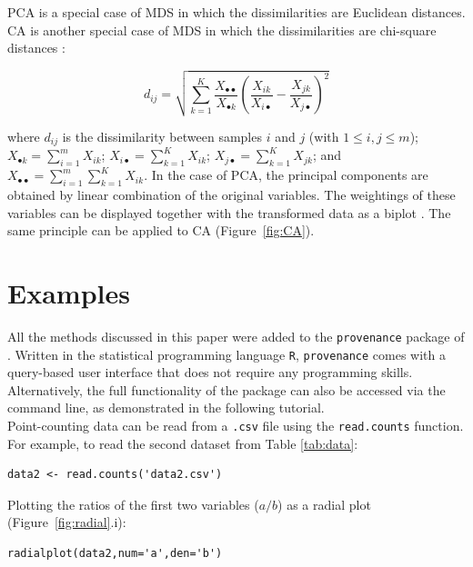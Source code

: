 \documentclass{article}
\begin{document}
PCA is a special case of MDS in which the dissimilarities are
Euclidean distances. CA is another special case of MDS in which the
dissimilarities are chi-square distances \citep{legendre2001,
  greenacre2005}:

\begin{equation}
  d_{ij} =
  \sqrt{
    \sum\limits_{k=1}^K
    \frac{X_{\bullet\bullet}}{X_{\bullet k}}
    \left(\frac{X_{ik}}{X_{i\bullet}} - \frac{X_{jk}}{X_{j\bullet}}\right)^2
  }
  \label{eq:dij}
\end{equation}

\noindent where $d_{ij}$ is the dissimilarity between samples $i$ and
$j$ (with $1 \leq i,j \leq m$); $X_{\bullet k} = \sum_{i=1}^{m}
X_{ik}$; $X_{i\bullet} = \sum_{k=1}^{K} X_{ik}$; $X_{j\bullet} =
\sum_{k=1}^{K} X_{jk}$; and $X_{\bullet\bullet} =
\sum_{i=1}^{m}\sum_{k=1}^{K} X_{ik}$.  In the case of PCA, the
principal components are obtained by linear combination of the
original variables. The weightings of these variables can be displayed
together with the transformed data as a biplot
\citep{aitchison2002}. The same principle can be applied to CA
(Figure~\ref{fig:CA}).

\section{Examples}
\label{sec:examples}

All the methods discussed in this paper were added to the
\texttt{provenance} package of \citet{vermeesch2016a}.  Written in the
statistical programming language \texttt{R}, \texttt{provenance} comes
with a query-based user interface that does not require any
programming skills. Alternatively, the full functionality of the
package can also be accessed via the command line, as demonstrated in
the following tutorial.\\

Point-counting data can be read from a \texttt{.csv} file using the
\texttt{read.counts} function. For example, to read the second dataset
from Table \ref{tab:data}:

\begin{verbatim}
data2 <- read.counts('data2.csv')
\end{verbatim}

Plotting the ratios of the first two variables ($a/b$) as a radial
plot (Figure~\ref{fig:radial}.i):

\begin{verbatim}
radialplot(data2,num='a',den='b')
\end{verbatim}
\end{document}
